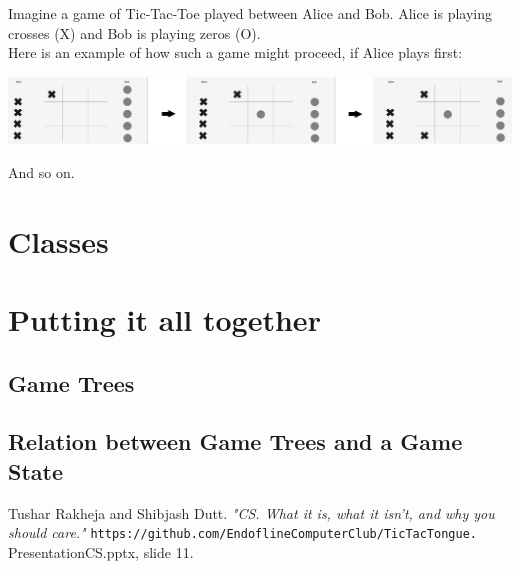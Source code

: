 \documentclass{article}
\begin{document}
\noindent Imagine a game of Tic-Tac-Toe played between Alice and Bob. Alice is playing crosses (X) and Bob is playing zeros (O). \\

\noindent Here is an example of how such a game might proceed, if Alice plays first:

\begin{center}
    \includegraphics[scale=0.11]{AliceVBob}
\end{center}

\noindent And so on.

\section{Classes}

\section{Putting it all together}

\subsection{Game Trees}

\subsection{Relation between Game Trees and a Game State}



\begin{thebibliography}{9}
Tushar Rakheja and Shibjash Dutt.
\textit{"CS. What it is, what it isn't, and why you should care."}
\texttt{https://github.com/EndoflineComputerClub/TicTacTongue.}
\\PresentationCS.pptx, slide 11. 
\end{thebibliography}
\end{document}
